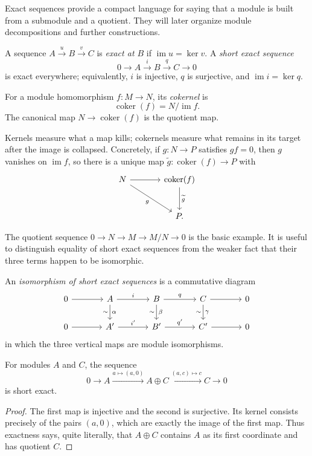 Exact sequences provide a compact language for saying that a module is built
from a submodule and a quotient. They will later organize module
decompositions and further constructions.
\begin{definition}
A sequence \(A\xrightarrow{u}B\xrightarrow{v}C\) is \emph{exact at
\(B\)} if \(\operatorname{im}u=\ker v\). A \emph{short exact sequence}
\[0\longrightarrow A\xrightarrow{i}B\xrightarrow{q}C\longrightarrow0\]
is exact everywhere; equivalently, \(i\) is injective, \(q\) is surjective,
and \(\operatorname{im}i=\ker q\).
\end{definition}

\begin{undefinition}[Cokernel]
For a module homomorphism \(f:M\to N\), its \emph{cokernel} is
\[
\operatorname{coker}(f)=N/\operatorname{im}f.
\]
The canonical map \(N\to\operatorname{coker}(f)\) is the quotient map.
\end{undefinition}

Kernels measure what a map kills; cokernels measure what remains in its target
after the image is collapsed.  Concretely, if \(g:N\to P\) satisfies
\(gf=0\), then \(g\) vanishes on \(\operatorname{im}f\), so there is a
unique map \(\widetilde g:\operatorname{coker}(f)\to P\) with
\[
\begin{tikzcd}[column sep=large,row sep=large]
N\arrow[r]\arrow[dr,"g"']&\operatorname{coker}(f)\arrow[d,"\widetilde g"]\\
&P.
\end{tikzcd}
\]

The quotient sequence \(0\to N\to M\to M/N\to0\) is the basic example.
It is useful to distinguish equality of short exact sequences from the
weaker fact that their three terms happen to be isomorphic.

\begin{definition}
An \emph{isomorphism of short exact sequences} is a commutative diagram
\[
\begin{tikzcd}[column sep=large]
0\arrow[r]&A\arrow[r,"i"]\arrow[d,"\alpha", "\sim"']&
B\arrow[r,"q"]\arrow[d,"\beta", "\sim"']&
C\arrow[r]\arrow[d,"\gamma", "\sim"']&0\\
0\arrow[r]&A'\arrow[r,"i'"]&B'\arrow[r,"q'"]&C'\arrow[r]&0
\end{tikzcd}
\]
in which the three vertical maps are module isomorphisms.
\end{definition}

\begin{proposition}\label{prop:canonical-split-sequence}
For modules \(A\) and \(C\), the sequence
\[
0\longrightarrow A\xrightarrow{a\mapsto(a,0)}A\oplus C
\xrightarrow{(a,c)\mapsto c}C\longrightarrow0
\]
is short exact.
\end{proposition}
\begin{proof}
The first map is injective and the second is surjective.  Its kernel consists
precisely of the pairs \((a,0)\), which are exactly the image of the first
map.  Thus exactness says, quite literally, that \(A\oplus C\) contains
\(A\) as its first coordinate and has quotient \(C\).
\end{proof}

